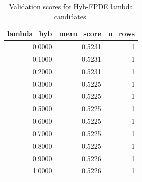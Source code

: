 \begin{table}[t]
\caption{Validation scores for Hyb-FPDE lambda candidates.}
\label{tab:lambda_distribution_computed}
\centering
\begin{tabular}{rrr}
\toprule
lambda\_hyb & mean\_score & n\_rows \\
\midrule
0.0000 & 0.5231 & 1 \\
0.1000 & 0.5231 & 1 \\
0.2000 & 0.5231 & 1 \\
0.3000 & 0.5225 & 1 \\
0.4000 & 0.5225 & 1 \\
0.5000 & 0.5225 & 1 \\
0.6000 & 0.5225 & 1 \\
0.7000 & 0.5225 & 1 \\
0.8000 & 0.5225 & 1 \\
0.9000 & 0.5226 & 1 \\
1.0000 & 0.5226 & 1 \\
\bottomrule
\end{tabular}

\end{table}
